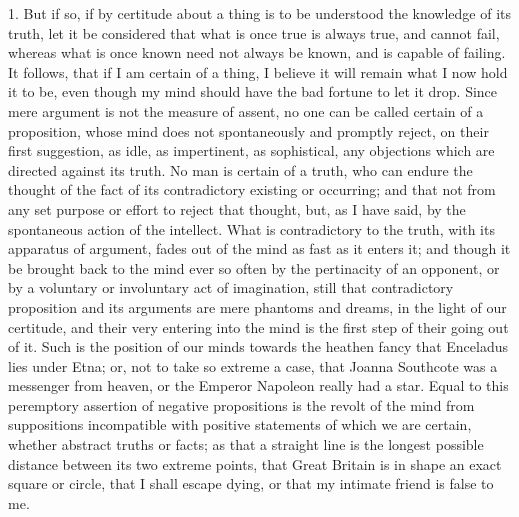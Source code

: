 1. But if so, if by certitude about a thing is to be understood the
knowledge of its truth, let it be considered that what is once true is
always true, and cannot fail, whereas what is once known need not
always be known, and is capable of failing. It follows, that if I am
certain of a thing, I believe it will remain what I now hold it to be,
even though my mind should have the bad fortune to let it drop. Since
mere argument is not the measure of assent, no one can be called
certain of a proposition, whose mind does not spontaneously and
promptly reject, on their first suggestion, as idle, as impertinent,
as sophistical, any objections which are directed against its truth.
No man is certain of a truth, who can endure the thought of the
fact of its contradictory existing or occurring; and that not from any
set purpose or effort to reject that thought, but, as I have said, by
the spontaneous action of the intellect. What is contradictory to the
truth, with its apparatus of argument, fades out of the mind as fast
as it enters it; and though it be brought back to the mind ever so
often by the pertinacity of an opponent, or by a voluntary or
involuntary act of imagination, still that contradictory proposition
and its arguments are mere phantoms and dreams, in the light of our
certitude, and their very entering into the mind is the first step of
their going out of it. Such is the position of our minds towards the
heathen fancy that Enceladus lies under Etna; or, not to take so
extreme a case, that Joanna Southcote was a messenger from heaven, or
the Emperor Napoleon really had a star. Equal to this peremptory
assertion of negative propositions is the revolt of the mind from
suppositions incompatible with positive statements of which we are
certain, whether abstract truths or facts; as that a straight line is
the longest possible distance between its two extreme points, that
Great Britain is in shape an exact square or circle, that I shall
escape dying, or that my intimate friend is false to me.

